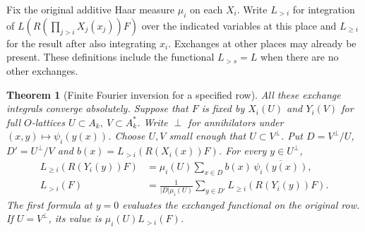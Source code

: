 \documentclass[a4paper,11pt]{article}
\newtheorem{theorem}[proposition]{Theorem}
\theoremstyle{definition}
\theoremstyle{remark}
\numberwithin{equation}{section}
\begin{document}
Fix the original additive Haar measure \(\mu_i\) on each \(X_i\).
Write \(L_{>i}\) for integration of \(L(R(\prod_{j>i}X_j(x_j))F)\)
over the indicated variables at this place and \(L_{\ge i}\) for
the result after also integrating \(x_i\). Exchanges at other
places may already be present. These definitions include the
functional \(L_{>s}=L\) when there are no other exchanges.

\begin{theorem}[Finite Fourier inversion for a specified row]\label{thm:exchangefourier336}
All these exchange integrals converge absolutely. Suppose that
\(F\) is fixed by \(X_i(U)\) and \(Y_i(V)\) for full \(O\)-lattices
\(U\subset A_k,\ V\subset A_k^*\). Write \(\perp\) for annihilators
under \((x,y)\mapsto\psi_i(y(x))\). Choose \(U,V\) small enough
that \(U\subset V^\perp\). Put \(D=V^\perp/U\), \(D'=U^\perp/V\)
and \(b(x)=L_{>i}(R(X_i(x))F)\). For every \(y\in U^\perp\),
\[
 \begin{split}
 L_{\ge i}(R(Y_i(y))F)
   &=\mu_i(U)\sum_{x\in D} b(x)\,\overline{\psi_i(y(x))},\\
 L_{>i}(F)&=\frac{1}{|D|\mu_i(U)}
                  \sum_{y\in D'}L_{\ge i}(R(Y_i(y))F).
 \end{split}
\]
The first formula at \(y=0\) evaluates the exchanged functional
on the original row. If \(U=V^\perp\), its value is
\(\mu_i(U)L_{>i}(F)\).
\end{theorem}
\end{document}
